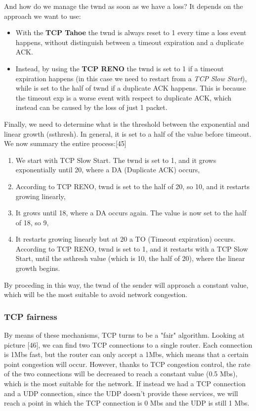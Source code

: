 And how do we manage the twnd as soon as we have a loss? It depends on the approach we want to use:
\begin{itemize}
    \item With the \textbf{TCP Tahoe} the twnd is always reset to 1 every time a loss event happens, without distinguish between a timeout expiration and a duplicate ACK.
    \item Instead, by using the \textbf{TCP RENO} the twnd is set to 1 if a timeout expiration happens (in this case we need to restart from a \textit{TCP Slow Start}), while is set to the half of twnd if a duplicate ACK happens. This is because the timeout exp is a worse event with respect to duplicate ACK, which instead can be caused by the loss of just 1 packet.
\end{itemize}

Finally, we need to determine what is the threshold between the exponential and linear growth (ssthresh). In general, it is set to a half of the value before timeout. We now summary the entire process:[45]
\begin{enumerate}
    \item We start with TCP Slow Start. The twnd is set to 1, and it grows exponentially until 20, where a DA (Duplicate ACK) occurs,
    \item According to TCP RENO, twnd is set to the half of 20, so 10, and it restarts growing linearly,
    \item It grows until 18, where a DA occurs again. The value is now set to the half of 18, so 9,
    \item It restarts growing linearly but at 20 a TO (Timeout expiration) occurs. According to TCP RENO, twnd is set to 1, and it restarts with a TCP Slow Start, until the ssthresh value (which is 10, the half of 20), where the linear growth begins.
\end{enumerate}

\noindent By proceding in this way, the twnd of the sender will approach a constant value, which will be the most suitable to avoid network congestion.

\subsubsection{TCP fairness}
By means of these mechanisms, TCP turns to be a "fair" algorithm. Looking at picture [46], we can find two TCP connections to a single router. Each connection is 1Mbs fast, but the router can only accept a 1Mbs, which means that a certain point congestion will occur. However, thanks to TCP congestion control, the rate of the two connections will be decreased to reach a constant value (0.5 Mbs), which is the most suitable for the network. If instead we had a TCP connection and a UDP connection, since the UDP doesn't provide these services, we will reach a point in which the TCP connection is 0 Mbs and the UDP is still 1 Mbs.